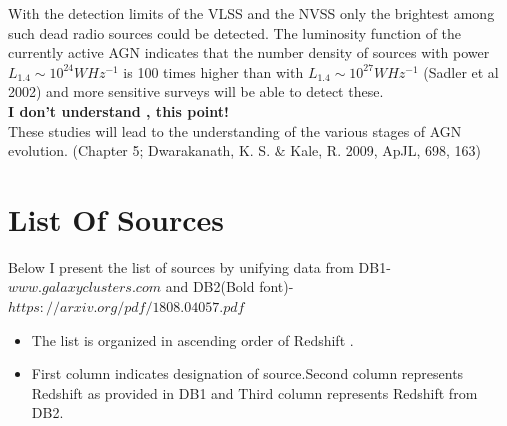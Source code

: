 \documentclass[11pt]{report}
\begin{document}
\begin{itemize}
With the detection limits of the VLSS and the NVSS only the brightest among such dead radio sources could be detected. The luminosity function of the currently active AGN indicates that the number density of sources with power $L_{1.4} \sim 10^{24} W Hz^{-1}$ is 100 times higher than with $L_{1.4} \sim 10^{27} W Hz^{-1}$ (Sadler et al 2002) and more sensitive surveys will be able to detect these.\\
\textbf{I don't understand , this point!}\\

 These studies will
lead to the understanding of the various stages of AGN evolution. (Chapter
5; Dwarakanath, K. S. $\&$ Kale, R. 2009, ApJL, 698, 163)


\end{itemize}
\chapter{List Of Sources}
Below I present the list of sources by unifying data from DB1-$www.galaxyclusters.com$ and DB2(Bold font)-$https://arxiv.org/pdf/1808.04057.pdf
$
\begin{itemize}
\item The list is organized in ascending order of Redshift .\\
\item First column indicates designation of source.Second column represents Redshift as provided in DB1  and Third column represents Redshift from DB2.
\end{itemize}
\end{document}

